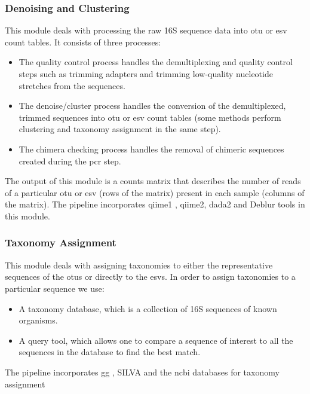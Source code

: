     \subsubsection*{Denoising and Clustering}
      \vspace{-5mm}
      This module deals with processing the raw 16S sequence data into \ac{otu} or \ac{esv} count tables.
      It consists of three processes:
      \begin{itemize}
        \item The quality control process handles the demultiplexing and quality control steps such as trimming adapters and trimming low-quality nucleotide stretches from the sequences.
        \item The denoise/cluster process handles the conversion of the demultiplexed, trimmed sequences into \ac{otu} or \ac{esv} count tables (some methods perform clustering and taxonomy assignment in the same step).
        \item The chimera checking process handles the removal of chimeric sequences created during the \ac{pcr} step.
      \end{itemize}
      The output of this module is a counts matrix that describes the number of reads of a particular \ac{otu} or \ac{esv} (rows of the matrix) present in each sample (columns of the matrix).
      The pipeline incorporates \ac{qiime1} \cite{Caporaso2010}, \ac{qiime2}, \ac{dada2} \cite{Callahan2016} and Deblur \cite{Amir2017} tools in this module.

    \subsubsection*{Taxonomy Assignment}
      \vspace{-5mm}
      This module deals with assigning taxonomies to either the representative sequences of the \ac{otu}s or directly to the \ac{esv}s.
      In order to assign taxonomies to a particular sequence we use:
      \begin{itemize}
        \item A taxonomy database, which is a collection of 16S sequences of known organisms.
        \item A query tool, which allows one to compare a sequence of interest to all the sequences in the database to find the best match.
      \end{itemize}
      The pipeline incorporates \ac{gg} \cite{DeSantis2006}, SILVA \cite{Quast2012} and the \ac{ncbi} \cite{Sayers2009} databases for taxonomy assignment

